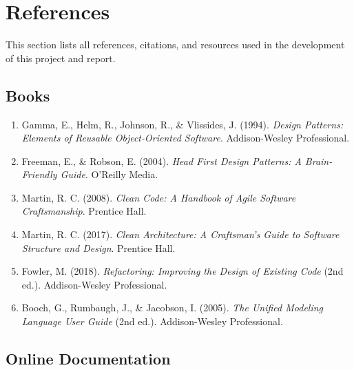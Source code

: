 \documentclass[11pt, a4paper]{article}
\theoremstyle{plain}
\theoremstyle{definition}
\begin{document}
\section{References}

This section lists all references, citations, and resources used in the development of this project and report.

\subsection{Books}

\begin{enumerate}
    \item Gamma, E., Helm, R., Johnson, R., \& Vlissides, J. (1994). \textit{Design Patterns: Elements of Reusable Object-Oriented Software}. Addison-Wesley Professional.
    
    \item Freeman, E., \& Robson, E. (2004). \textit{Head First Design Patterns: A Brain-Friendly Guide}. O'Reilly Media.
    
    \item Martin, R. C. (2008). \textit{Clean Code: A Handbook of Agile Software Craftsmanship}. Prentice Hall.
    
    \item Martin, R. C. (2017). \textit{Clean Architecture: A Craftsman's Guide to Software Structure and Design}. Prentice Hall.
    
    \item Fowler, M. (2018). \textit{Refactoring: Improving the Design of Existing Code} (2nd ed.). Addison-Wesley Professional.
    
    \item Booch, G., Rumbaugh, J., \& Jacobson, I. (2005). \textit{The Unified Modeling Language User Guide} (2nd ed.). Addison-Wesley Professional.
\end{enumerate}

\subsection{Online Documentation}
\end{document}
